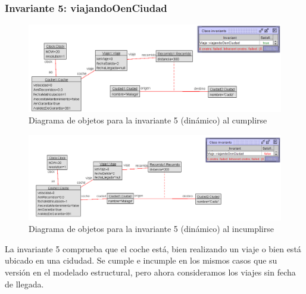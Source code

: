 \documentclass[12pt.a4paper]{article}
\begin{document}
\subsubsection{Invariante 5: viajandoOenCiudad}
\vspace{1.0 cm}
\begin{figure}[H]
     \includegraphics[width=1\linewidth]{Soils/dinamico_inv5_true.png}
     \caption{Diagrama de objetos para la invariante 5 (dinámico) al cumplirse}
\end{figure}

\begin{figure}[H]
     \includegraphics[width=1\linewidth]{Soils/dinamico_inv5_false.png}
     \caption{Diagrama de objetos para la invariante 5 (dinámico) al incumplirse}
\end{figure}

La invariante 5 comprueba que el coche está, bien realizando un viaje o bien está ubicado en una cidudad. Se cumple e incumple en los mismos casos que su versión en el modelado estructural, pero ahora consideramos los viajes sin fecha de llegada.
\end{document}

